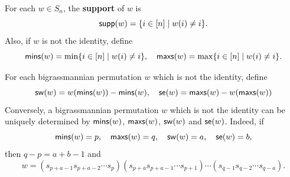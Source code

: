 \documentclass[12pt]{amsart}
\theoremstyle{definition}
\theoremstyle{remark}
\begin{document}
For each $w \in S_n$, the \textbf{support} of $w$ is
\begin{equation}
{\sf supp} (w) = \{ i \in [n] \mid w(i) \neq i\}.
\end{equation}
Also, if $w$ is not the identity, define
\begin{equation}
{\sf mins}(w) = \min \{ i \in [n] \mid w(i) \neq i \}, \quad {\sf maxs }(w) = \max \{ i \in [n] \mid w(i) \neq i \}.
\end{equation}

For each bigrassmannian permutation $w$ which is not the identity, define
\begin{equation}
{\sf sw}(w) = w({\sf mins}(w)) - {\sf mins}(w) , \quad {\sf se}(w) = {\sf maxs}(w) - w({\sf maxs}(w)) 
\end{equation}
Conversely, a bigrassmannian permutation $w$ which is not the identity can be uniquely determined by ${\sf mins}(w)$, ${\sf maxs}(w)$, ${\sf sw}(w)$ and ${\sf se}(w)$. Indeed, if
\begin{equation}
{\sf mins}(w) = p , \quad {\sf maxs}(w) = q , \quad {\sf sw}(w) = a , \quad {\sf se}(w) = b,
\end{equation}
then $q - p = a+ b -1$ and
\begin{equation}
w = (s_{p+a-1} s_{p+a-2} \cdots s_p)(s_{p+a} s_{p+a-1} \cdots s_{p+1}) \cdots (s_{q-1} s_{q-2} \cdots s_{q-a}).
\end{equation}
\end{document}
